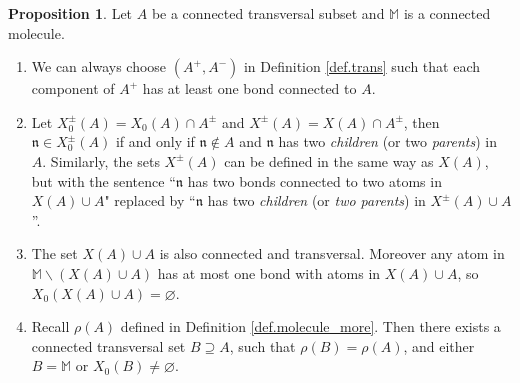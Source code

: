 \documentclass[10pt, reqno]{amsart}
\newcommand{\Mb}{\mathbb M}
\newcommand{\nf}{\mathfrak n}
\theoremstyle{definition}
\newtheorem{proposition}[theorem]{Proposition}
\theoremstyle{remark}
\numberwithin{equation}{section}
\begin{document}
\begin{proposition}
\label{prop.trans}
Let $A$ be a connected transversal subset and $\Mb$ is a connected molecule.
\begin{enumerate}
\item We can always choose $(A^+,A^-)$ in Definition \ref{def.trans} such that each component of $A^+$ has at least one bond connected to $A$.
\item Let $X_0^\pm (A)=X_0(A)\cap A^\pm$ and $X^\pm (A)=X(A)\cap A^\pm$, then $\nf\in X_0^\pm(A)$ if and only if $\nf\not\in A$ and $\nf$ has two \emph{children} (or two \emph{parents}) in $A$. Similarly, the sets $X^\pm(A)$ can be defined in the same way as $X(A)$, but with the sentence ``$\nf$ has two bonds connected to two atoms in $X(A)\cup A$" replaced by ``$\nf$ has two \emph{children} (or \emph{two parents}) in $X^\pm (A)\cup A$''.
\item The set $X(A)\cup A$ is also connected and transversal. Moreover any atom in $\Mb\backslash (X(A)\cup A)$ has at most one bond with atoms in $X(A)\cup A$, so $X_0(X(A)\cup A)=\varnothing$.
\item Recall $\rho(A)$ defined in Definition \ref{def.molecule_more}. Then there exists a connected transversal set $B\supseteq A$, such that $\rho(B)=\rho(A)$, and either $B=\Mb$ or $X_0(B)\neq\varnothing$.
\end{enumerate}
\end{proposition}
\end{document}
